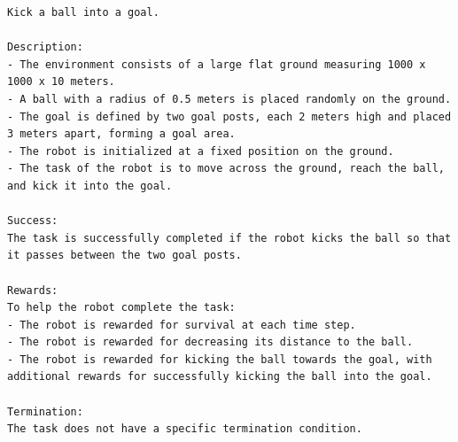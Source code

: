 \begin{lstlisting}[language={}]
Kick a ball into a goal.

Description:
- The environment consists of a large flat ground measuring 1000 x 1000 x 10 meters.
- A ball with a radius of 0.5 meters is placed randomly on the ground.
- The goal is defined by two goal posts, each 2 meters high and placed 3 meters apart, forming a goal area.
- The robot is initialized at a fixed position on the ground.
- The task of the robot is to move across the ground, reach the ball, and kick it into the goal.

Success:
The task is successfully completed if the robot kicks the ball so that it passes between the two goal posts.

Rewards:
To help the robot complete the task:
- The robot is rewarded for survival at each time step.
- The robot is rewarded for decreasing its distance to the ball.
- The robot is rewarded for kicking the ball towards the goal, with additional rewards for successfully kicking the ball into the goal.

Termination:
The task does not have a specific termination condition.
\end{lstlisting}
